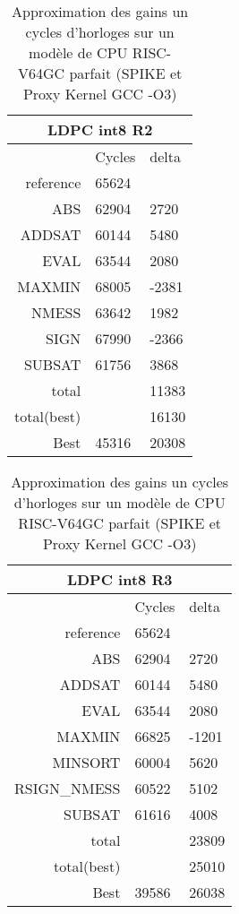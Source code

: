 
\begin{table}[tb]
\centering
    \begin{tabular}{|r|l|l|}
        \toprule
            \multicolumn{3}{|c|}{LDPC int8 R2} \\ \midrule
                        & Cycles    & delta  \\ \midrule
            reference   & 65624     &        \\ \midrule
            ABS         & 62904     & 2720   \\ \midrule
            ADDSAT      & 60144     & 5480   \\ \midrule
            EVAL        & 63544     & 2080   \\ \midrule
            MAXMIN      & 68005     & -2381  \\ \midrule
            NMESS       & 63642     & 1982   \\ \midrule
            SIGN        & 67990     & -2366  \\ \midrule
            SUBSAT      & 61756     & 3868   \\ \midrule
            total       &           & 11383  \\ \midrule
            total(best) &           & 16130  \\ \midrule
            Best        & 45316     & 20308 \\
            \bottomrule
    \end{tabular}  
         \begin{tabular}{|r|l|l|}
         \toprule
             \multicolumn{3}{|c|}{LDPC int8 R3} \\ \midrule
                         & Cycles    & delta  \\ \midrule
             reference   & 65624     &        \\ \midrule
             ABS         & 62904     & 2720   \\ \midrule
             ADDSAT      & 60144     & 5480   \\ \midrule
             EVAL        & 63544     & 2080   \\ \midrule
             MAXMIN      & 66825     & -1201  \\ \midrule
             MINSORT     & 60004     & 5620   \\ \midrule
             RSIGN\_NMESS & 60522     & 5102   \\ \midrule
             SUBSAT      & 61616     & 4008   \\ \midrule
             total       &           & 23809  \\ \midrule
             total(best) &           & 25010  \\ \midrule
             Best        & 39586     & 26038 \\
             \bottomrule
     \end{tabular}  
\caption{Approximation des gains un cycles d'horloges sur un modèle de CPU RISC-V64GC parfait (SPIKE et Proxy Kernel GCC -O3)}
\label{ldpc_theo}
\end{table}